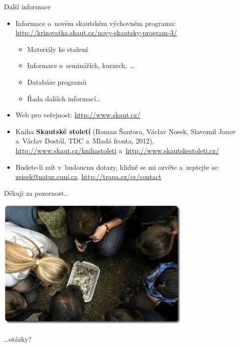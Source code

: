 \documentclass[compress,xelatex,xcolor=dvipsnames,print]{beamer}
\begin{document}
\begin{frame}{Další informace}
\begin{itemize}
\item Informace o~novém skautském výchovném programu: \href{http://krizovatka.skaut.cz/novy-skautsky-program-3/}{http://krizovatka.skaut.cz/novy-skautsky-program-3/}
 \begin{itemize}
 \item Materiály ke stažení
 \item Informace o~seminářích, kurzech,~\ldots
 \item Databáze programů
 \item Řada dalších informací\ldots
 \end{itemize}
\item Web pro veřejnost: \href{http://www.skaut.cz/}{http://www.skaut.cz/}
\item Kniha \textbf{Skautské století} (Roman Šantora, Václav Nosek, Slavomil Janov a~Václav Dostál, TDC a~Mladá fronta, 2012), \href{http://www.skaut.cz/knihastoleti}{http://www.skaut.cz/knihastoleti} a~\href{http://www.skautskestoleti.cz/}{http://www.skautskestoleti.cz/}
\item Budete-li mít v~budoucnu dotazy, klidně se mi ozvěte a~zeptejte se: \href{mailto:zeisek@natur.cuni.cz}{zeisek@natur.cuni.cz}, \href{http://trapa.cz/cs/contact}{http://trapa.cz/cs/contact}
\end{itemize}
\end{frame}

\begin{frame}{Děkuji za pozornost\ldots}
\begin{center}
\includegraphics[height=6.5cm]{zaver.jpg}
\end{center}
\begin{flushright}
\begin{large}\ldots otázky?\end{large}
\end{flushright}
\end{frame}
\end{document}
